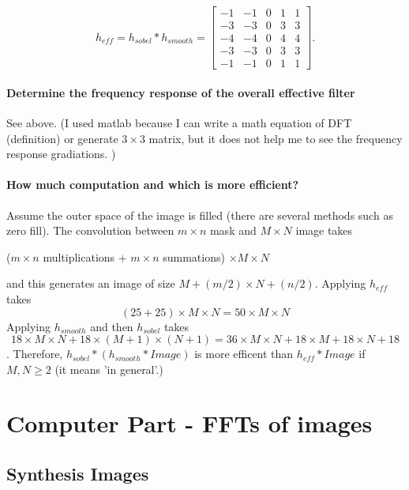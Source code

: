 \documentclass[article,oneside]{memoir}
\begin{document}
$$ h_{eff} = h_{sobel} * h_{smooth} = \left[ \begin{array}{ccccc}
-1 & -1 & 0 & 1 & 1 \\
-3 & -3 & 0 & 3 & 3 \\
-4 & -4 & 0 & 4 & 4 \\
-3 & -3 & 0 & 3 & 3 \\
-1 & -1 & 0 & 1 & 1 \end{array} \right]. $$

\subsubsection{Determine the frequency response of the overall effective filter}

See above. 
(I used matlab because I can write a math equation of DFT (definition) or generate $ 3 \times 3 $ matrix, but it does not help me to see the frequency response gradiations. )

\subsubsection{How much computation and which is more efficient?}

Assume the outer space of the image is filled (there are several methods such as zero fill). 
The convolution between $ m \times n $ mask and $ M \times N $ image takes
\begin{center}
($ m \times n $ multiplications + $ m \times n $ summations) $ \times M \times N $
\end{center}
and this generates an image of size $ M+(m/2) \times N+(n/2) $. 
Applying $h_{eff}$ takes
$$ (25 + 25) \times M \times N = 50 \times M \times N $$
Applying $ h_{smooth} $ and then $ h_{sobel} $ takes
$$ 18 \times M \times N + 18 \times (M+1) \times (N+1) = 36 \times M \times N + 18 \times M + 18 \times N + 18 $$. 
Therefore, $ h_{sobel} * (h_{smooth} * Image) $ is more efficent than $ h_{eff} * Image $ if $ M, N \geq 2 $ (it means 'in general'.)

\newpage

\chapter{Computer Part - FFTs of images}

\section{Synthesis Images}
\end{document}
